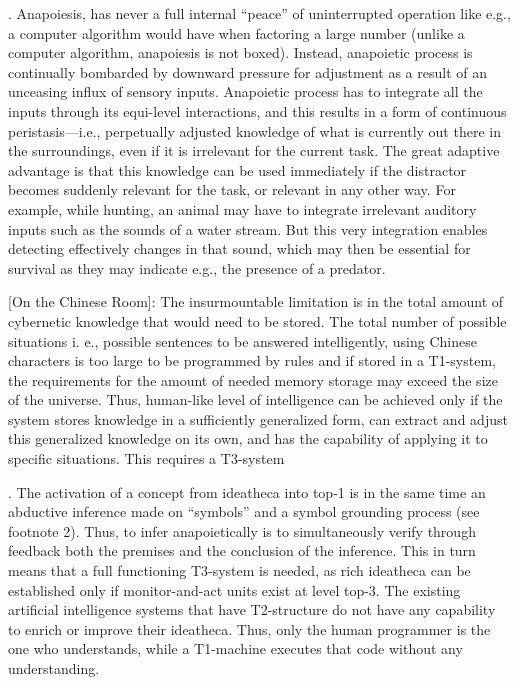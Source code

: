 \documentclass[10pt,a4paper]{article}
\begin{document}
. Anapoiesis,
has never a full internal “peace” of uninterrupted operation
like e.g., a computer algorithm would have when factoring a large
number (unlike a computer algorithm, anapoiesis is not boxed).
Instead, anapoietic process is continually bombarded by downward
pressure for adjustment as a result of an unceasing influx of
sensory inputs. Anapoietic process has to integrate all the inputs
through its equi-level interactions, and this results in a form of
continuous peristasis—i.e., perpetually adjusted knowledge of
what is currently out there in the surroundings, even if it is
irrelevant for the current task.
The great adaptive advantage is that
this knowledge can be used immediately if the distractor becomes
suddenly relevant for the task, or relevant in any other way. For
example, while hunting, an animal may have to integrate irrelevant
auditory inputs such as the sounds of a water stream. But this
very integration enables detecting effectively changes in that
sound, which may then be essential for survival as they may
indicate e.g., the presence of a predator. 

[On the Chinese Room]: The insurmountable limitation is in the total amount of cybernetic
knowledge that would need to be stored. The total number of possible situations i.
e., possible sentences to be answered intelligently, using Chinese characters is too
large to be programmed by rules and if stored in a T1-system, the requirements for
the amount of needed memory storage may exceed the size of the universe. Thus,
human-like level of intelligence can be achieved only if the system stores knowledge
in a sufficiently generalized form, can extract and adjust this generalized
knowledge on its own, and has the capability of applying it to specific situations.
This requires a T3-system


. The
activation of a concept from ideatheca into top-1 is in the same time
an abductive inference made on “symbols” and a symbol grounding
process (see footnote 2). Thus, to infer anapoietically is to simultaneously
verify through feedback both the premises and the conclusion
of the inference. This in turn means that a full functioning T3-system is
needed, as rich ideatheca can be established only if monitor-and-act
units exist at level top-3. The existing artificial intelligence systems
that have T2-structure do not have any capability to enrich or improve
their ideatheca. Thus, only the human programmer is the one who
understands, while a T1-machine executes that code without any
understanding.
\end{document}
